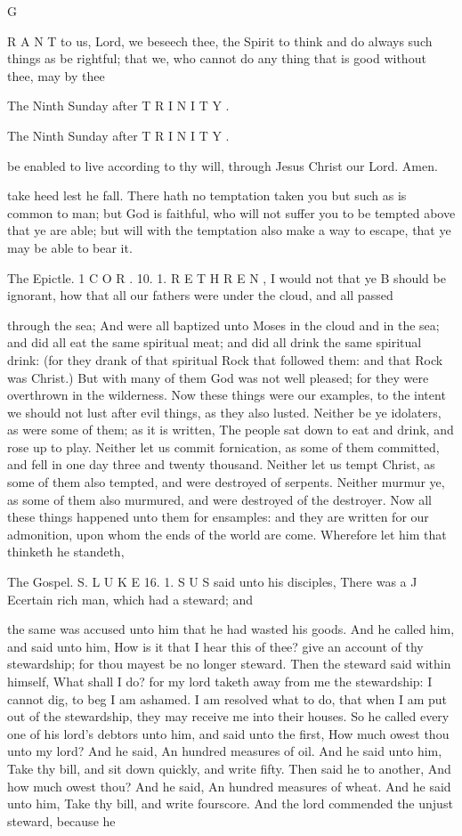 G

R A N T to us, Lord, we beseech thee, the Spirit to think and do always such things as be rightful; that we, who cannot do any thing that is good without thee, may by thee

The Ninth Sunday after T R I N I T Y .

The Ninth Sunday after T R I N I T Y .

be enabled to live according to thy will, through Jesus Christ our Lord. Amen.

take heed lest he fall. There hath no temptation taken you but such as is common to man; but God is faithful, who will not suffer you to be tempted above that ye are able; but will with the temptation also make a way to escape, that ye may be able to bear it.

The Epictle. 1 C O R . 10. 1. R E T H R E N , I would not that ye B should be ignorant, how that all our fathers were under the cloud, and all passed

through the sea; And were all baptized unto Moses in the cloud and in the sea; and did all eat the same spiritual meat; and did all drink the same spiritual drink: (for they drank of that spiritual Rock that followed them: and that Rock was Christ.) But with many of them God was not well pleased; for they were overthrown in the wilderness. Now these things were our examples, to the intent we should not lust after evil things, as they also lusted. Neither be ye idolaters, as were some of them; as it is written, The people sat down to eat and drink, and rose up to play. Neither let us commit fornication, as some of them committed, and fell in one day three and twenty thousand. Neither let us tempt Christ, as some of them also tempted, and were destroyed of serpents. Neither murmur ye, as some of them also murmured, and were destroyed of the destroyer. Now all these things happened unto them for ensamples: and they are written for our admonition, upon whom the ends of the world are come. Wherefore let him that thinketh he standeth,

The Gospel. S. L U K E 16. 1. S U S said unto his disciples, There was a J Ecertain rich man, which had a steward; and

the same was accused unto him that he had wasted his goods. And he called him, and said unto him, How is it that I hear this of thee? give an account of thy stewardship; for thou mayest be no longer steward. Then the steward said within himself, What shall I do? for my lord taketh away from me the stewardship: I cannot dig, to beg I am ashamed. I am resolved what to do, that when I am put out of the stewardship, they may receive me into their houses. So he called every one of his lord’s debtors unto him, and said unto the first, How much owest thou unto my lord? And he said, An hundred measures of oil. And he said unto him, Take thy bill, and sit down quickly, and write fifty. Then said he to another, And how much owest thou? And he said, An hundred measures of wheat. And he said unto him, Take thy bill, and write fourscore. And the lord commended the unjust steward, because he

